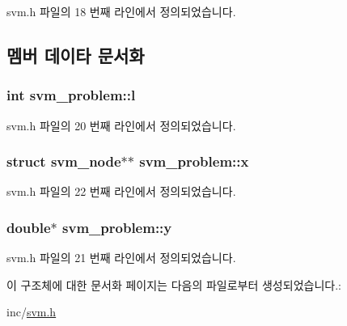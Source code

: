 svm.\+h 파일의 18 번째 라인에서 정의되었습니다.



\subsection{멤버 데이타 문서화}
\hypertarget{structsvm__problem_a4350eb6820f0d6126bffb6264cec65b3}{
\subsubsection[{l}]{\setlength{\rightskip}{0pt plus 5cm}int svm\+\_\+problem\+::l}}\label{structsvm__problem_a4350eb6820f0d6126bffb6264cec65b3}


svm.\+h 파일의 20 번째 라인에서 정의되었습니다.

\hypertarget{structsvm__problem_acddda9b49a8e38bbda079f35c2e18984}{
\subsubsection[{x}]{\setlength{\rightskip}{0pt plus 5cm}struct {\bf svm\+\_\+node}$\ast$$\ast$ svm\+\_\+problem\+::x}}\label{structsvm__problem_acddda9b49a8e38bbda079f35c2e18984}


svm.\+h 파일의 22 번째 라인에서 정의되었습니다.

\hypertarget{structsvm__problem_a59dec12ff090571bc9592ba9fb306780}{
\subsubsection[{y}]{\setlength{\rightskip}{0pt plus 5cm}double$\ast$ svm\+\_\+problem\+::y}}\label{structsvm__problem_a59dec12ff090571bc9592ba9fb306780}


svm.\+h 파일의 21 번째 라인에서 정의되었습니다.



이 구조체에 대한 문서화 페이지는 다음의 파일로부터 생성되었습니다.\+:\begin{DoxyCompactItemize}
\item 
inc/\hyperlink{svm_8h}{svm.\+h}\end{DoxyCompactItemize}
